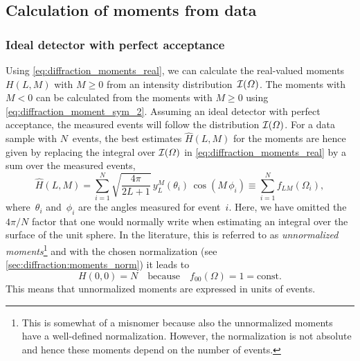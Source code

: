\subsection{Calculation of moments from data}%
\label{sec:diffraction:moments_data}

\subsubsection{Ideal detector with perfect acceptance}%
\label{sec:diffraction:moments_data_no_acc}

Using \cref{eq:diffraction_moments_real}, we can calculate the
real-valued moments $H(L, M)$ with $M \geq 0$ from an intensity
distribution~$\mathcal{I}(\Omega)$.  The moments with $M < 0$ can be
calculated from the moments with $M \geq 0$ using
\cref{eq:diffraction_moment_sym_2}.  Assuming an ideal detector with
perfect acceptance, the measured events will follow the distribution
$\mathcal{I}(\Omega)$.  For a data sample with $N$~events, the best
estimates $\hat{H}(L, M)$ for the moments are hence given by replacing
the integral over $\mathcal{I}(\Omega)$ in
\cref{eq:diffraction_moments_real} by a sum over the measured events,
\ie
\begin{equation}
  \label{eq:diffraction_moments_estimate}
  \hat{H}(L, M)
  = \sum_{i = 1}^N \sqrt{\frac{4 \pi}{2 L + 1}}\, y_L^M(\theta_i)\, \cos(M\, \phi_i)
  \equiv \sum_{i = 1}^N f_{L M}(\Omega_i),
\end{equation}
where~$\theta_i$ and~$\phi_i$ are the angles measured for event~$i$.
Here, we have omitted the $4 \pi / N$ factor that one would normally
write when estimating an integral over the surface of the unit sphere.
In the literature, this is referred to as \emph{unnormalized
moments}\footnote{This is somewhat of a misnomer because also the
unnormalized moments have a well-defined normalization.  However, the
normalization is not absolute and hence these moments depend on the
number of events.} and with the chosen normalization (see
\cref{sec:diffraction:moments_norm}) it leads to
\begin{equation}
  \label{eq:diffraction_norm_00}
  H(0, 0)
  = N
  \quad\text{because}\quad
  f_{00}(\Omega)
  = 1
  = \text{const}.
\end{equation}
This means that unnormalized moments are expressed in units of events.

